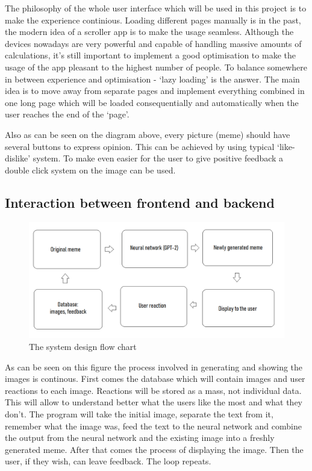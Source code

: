 \documentclass[12pt]{report}
\begin{document}
    The philosophy of the whole user interface which will be used in this project is to make the experience continious. Loading different pages manually is in the past, the modern idea of a scroller app is to make the usage seamless. Although the devices nowadays are very powerful and capable of handling massive amounts of calculations, it's still
    important to implement a good optimisation to make the usage of the app pleasant to the highest number of people. To balance somewhere in between experience and optimisation - `lazy loading' is the answer. The main idea is to move away from separate pages and implement everything combined in one long page which will be loaded consequentially and automatically when the user reaches the end of the `page'.

    Also as can be seen on the diagram above, every picture (meme) should have several buttons to express opinion. This can be achieved by using typical `like-dislike' system. To make even easier for the user to give positive feedback a double click system on the image can be used.
    
    \clearpage

    \subsection*{Interaction between frontend and backend}

    \begin{figure}[htbp]
        \centerline{\includegraphics[scale=.5]{img/flow_diagram.png}}
        \label{flow_diagram}
        \caption{The system design flow chart}
    \end{figure}

    As can be seen on this figure the process involved in generating and showing the images is continous. First comes the database which will contain images and user reactions to each image. Reactions will be stored as a mass, not individual data. This will allow to understand better what the users like the most and what they don't. 
    The program will take the initial image, separate the text from it, remember what the image was, feed the text to the neural network and combine the output from the neural network and the existing image into a freshly generated meme. After that comes the process of displaying the image. Then the user, if they wish, can leave feedback. The loop repeats.
\end{document}
